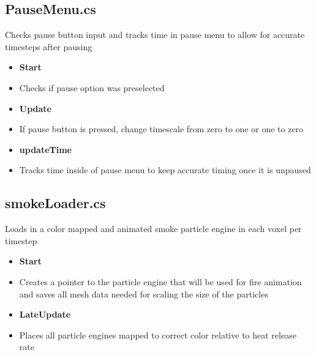 \subsection{PauseMenu.cs}
Checks pause button input and tracks time in pause menu to allow for accurate timesteps after pausing 
\begin{itemize}
    \item \textbf{Start}
    \item[] Checks if pause option was preselected

    \item \textbf{ Update}
    \item[] If pause button is pressed, change timescale from zero to one or one to zero


    \item \textbf{updateTime}
    \item[] Tracks time inside of pause menu to keep accurate timing once it is unpaused
\end{itemize}

\subsection{smokeLoader.cs}
Loads in a color mapped and animated smoke particle engine in each voxel per timestep
\begin{itemize}
    \item \textbf{Start}
    \item[] Creates a pointer to the particle engine that will be used for fire animation and saves all mesh data needed for scaling the size of the particles

    \item \textbf{LateUpdate} 
    \item[] Places all particle engines mapped to correct color relative to heat release rate
\end{itemize}
    


